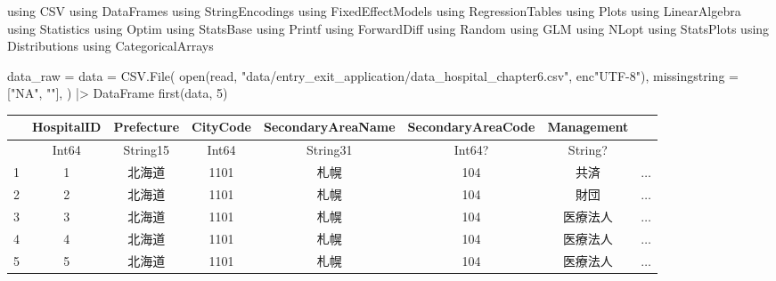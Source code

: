 \documentclass[
  letterpaper,
  DIV=11,
  numbers=noendperiod]{scrreprt}
\newenvironment{Shaded}{\begin{snugshade}}{\end{snugshade}}
\newcommand{\BuiltInTok}[1]{\textcolor[rgb]{0.00,0.23,0.31}{#1}}
\newcommand{\FloatTok}[1]{\textcolor[rgb]{0.68,0.00,0.00}{#1}}
\newcommand{\FunctionTok}[1]{\textcolor[rgb]{0.28,0.35,0.67}{#1}}
\newcommand{\ImportTok}[1]{\textcolor[rgb]{0.00,0.46,0.62}{#1}}
\newcommand{\NormalTok}[1]{\textcolor[rgb]{0.00,0.23,0.31}{#1}}
\newcommand{\OperatorTok}[1]{\textcolor[rgb]{0.37,0.37,0.37}{#1}}
\newcommand{\StringTok}[1]{\textcolor[rgb]{0.13,0.47,0.30}{#1}}
\begin{document}
\begin{Shaded}
\begin{Highlighting}[]
\ImportTok{using} \BuiltInTok{CSV}
\ImportTok{using} \BuiltInTok{DataFrames}
\ImportTok{using} \BuiltInTok{StringEncodings}
\ImportTok{using} \BuiltInTok{FixedEffectModels}
\ImportTok{using} \BuiltInTok{RegressionTables}
\ImportTok{using} \BuiltInTok{Plots}
\ImportTok{using} \BuiltInTok{LinearAlgebra}
\ImportTok{using} \BuiltInTok{Statistics}
\ImportTok{using} \BuiltInTok{Optim}
\ImportTok{using} \BuiltInTok{StatsBase}
\ImportTok{using} \BuiltInTok{Printf}
\ImportTok{using} \BuiltInTok{ForwardDiff}
\ImportTok{using} \BuiltInTok{Random}
\ImportTok{using} \BuiltInTok{GLM}
\ImportTok{using} \BuiltInTok{NLopt}
\ImportTok{using} \BuiltInTok{StatsPlots}
\ImportTok{using} \BuiltInTok{Distributions}
\ImportTok{using} \BuiltInTok{CategoricalArrays}
\end{Highlighting}
\end{Shaded}

\begin{Shaded}
\begin{Highlighting}[]
\NormalTok{data\_raw }\OperatorTok{=}\NormalTok{ data }\OperatorTok{=}\NormalTok{ CSV.}\FunctionTok{File}\NormalTok{(}
    \FunctionTok{open}\NormalTok{(read, }\StringTok{"data/entry\_exit\_application/data\_hospital\_chapter6.csv"}\NormalTok{, enc}\StringTok{"UTF{-}8"}\NormalTok{),}
\NormalTok{    missingstring }\OperatorTok{=}\NormalTok{ [}\StringTok{"NA"}\NormalTok{, }\StringTok{""}\NormalTok{],}
\NormalTok{    ) }\OperatorTok{|\textgreater{}}\NormalTok{ DataFrame}
\FunctionTok{first}\NormalTok{(data, }\FloatTok{5}\NormalTok{)}
\end{Highlighting}
\end{Shaded}

\begin{tabular}{r|ccccccc}
    & HospitalID & Prefecture & CityCode & SecondaryAreaName & SecondaryAreaCode & Management & \\
    \hline
    & Int64 & String15 & Int64 & String31 & Int64? & String? & \\
    \hline
    1 & 1 & 北海道 & 1101 & 札幌 & 104 & 共済 & $\dots$ \\
    2 & 2 & 北海道 & 1101 & 札幌 & 104 & 財団 & $\dots$ \\
    3 & 3 & 北海道 & 1101 & 札幌 & 104 & 医療法人 & $\dots$ \\
    4 & 4 & 北海道 & 1101 & 札幌 & 104 & 医療法人 & $\dots$ \\
    5 & 5 & 北海道 & 1101 & 札幌 & 104 & 医療法人 & $\dots$ \\
\end{tabular}
\end{document}
